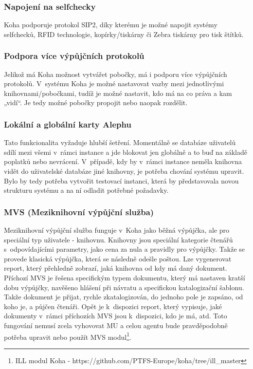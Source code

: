 \documentclass[
	11pt, oneside, printed, final, palatino, monochrome
	microtype,
	table,   %
	lof,     %
	lot     %
]{fithesis3}
\begin{document}
{\subsubsection{Napojení na selfchecky}
Koha podporuje protokol SIP2, díky kterému je možné napojit systémy selfchecků, RFID technologie, kopírky/tiskárny či Zebra tiskárny pro tisk štítků.%

\subsubsection{Podpora více výpůjčních protokolů}
Jelikož má Koha možnost vytvářet pobočky, má i podporu více výpůjčních protokolů. V~systému Koha je možné nastavovat vazby mezi jednotlivými knihovnami/pobočkami, tudíž je možné nastavit, kdo má na co práva a kam „vidí“. Je tedy možné pobočky propojit nebo naopak rozdělit.

\subsubsection{Lokální a globální karty Alephu}
Tato funkcionalita vyžaduje hlubší šetření. Momentálně se databáze uživatelů sdílí mezi všemi v~rámci instance a jde blokovat jen globálně a to buď na základě poplatků nebo nevrácení. V~případě, kdy by v~rámci instance neměla knihovna vidět do uživatelské databáze jiné knihovny, je potřeba chování systému upravit. Bylo by tedy potřeba vytvořit testovací instanci, která by představovala novou strukturu systému a na ní odladit potřebné požadavky.

\subsubsection{MVS (Meziknihovní výpůjční služba)}
Meziknihovní výpůjční služba funguje v~Koha jako běžná výpůjčka, ale pro speciální typ uživatele - knihovnu. Knihovny jsou speciální kategorie čtenářů s~odpovídajícími parametry, jako cena za nula a pravidly pro výpůjčky. Takže se provede klasická výpůjčka, která se následně odešle poštou. Lze vygenerovat report, který přehledně zobrazí, jaká knihovna od kdy má daný dokument. Příchozí MVS je řešena specifickým typem dokumentu, který má nastaven kratší dobu výpůjčky, navěšeno hlášení při návratu a specifickou katalogizační šablonu. Takže dokument je přijat, rychle zkatalogizován, do jednoho pole je zapsáno, od koho je, a půjčen čtenáři. Opět je k~dispozici report, který vypisuje, jaké dokumenty v~rámci příchozích MVS jsou k~dispozici, kdo je má, atd. Toto fungování nemusí zcela vyhovovat MU a celou agentu bude pravděpodobně potřeba upravit nebo použít MVS modul\footnote{ILL modul Koha - https://github.com/PTFS-Europe/koha/tree/ill\_master}.

}
\end{document}

